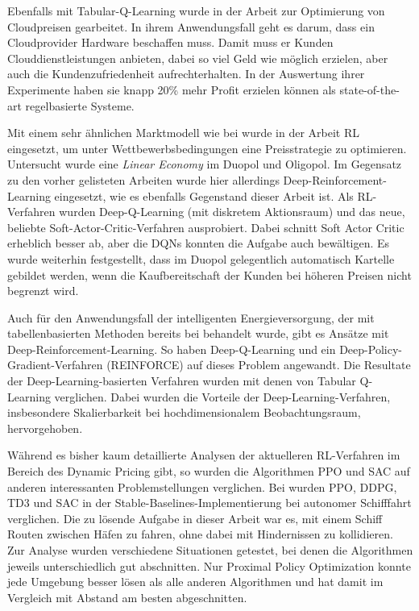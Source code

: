 Ebenfalls mit Tabular-Q-Learning wurde in der Arbeit \cite{9086147} zur Optimierung von Cloudpreisen gearbeitet.
In ihrem Anwendungsfall geht es darum, dass ein Cloudprovider Hardware beschaffen muss.
Damit muss er Kunden Clouddienstleistungen anbieten, dabei so viel Geld wie möglich erzielen, aber auch die Kundenzufriedenheit aufrechterhalten.
In der Auswertung ihrer Experimente haben sie knapp 20\% mehr Profit erzielen können als state-of-the-art regelbasierte Systeme.

Mit einem sehr ähnlichen Marktmodell wie bei \cite{10.1145/3219819.3219833} wurde in der Arbeit \cite{Kastius2022} RL eingesetzt, um unter Wettbewerbsbedingungen eine Preisstrategie zu optimieren.
Untersucht wurde eine \textit{Linear Economy} im Duopol und Oligopol.
Im Gegensatz zu den vorher gelisteten Arbeiten wurde hier allerdings Deep-Reinforcement-Learning eingesetzt, wie es ebenfalls Gegenstand dieser Arbeit ist.
Als RL-Verfahren wurden Deep-Q-Learning (mit diskretem Aktionsraum) und das neue, beliebte Soft-Actor-Critic-Verfahren ausprobiert.
Dabei schnitt Soft Actor Critic erheblich besser ab, aber die DQNs konnten die Aufgabe auch bewältigen.
Es wurde weiterhin festgestellt, dass im Duopol gelegentlich automatisch Kartelle gebildet werden, wenn die Kaufbereitschaft der Kunden bei höheren Preisen nicht begrenzt wird.

Auch für den Anwendungsfall der intelligenten Energieversorgung, der mit tabellenbasierten Methoden bereits bei \cite{Kim2016DynamicPA} behandelt wurde, gibt es Ansätze mit Deep-Reinforcement-Learning.
So haben \cite{8356086} Deep-Q-Learning und ein Deep-Policy-Gradient-Verfahren (REINFORCE) auf dieses Problem angewandt.
Die Resultate der Deep-Learning-basierten Verfahren wurden mit denen von Tabular Q-Learning verglichen.
Dabei wurden die Vorteile der Deep-Learning-Verfahren, insbesondere Skalierbarkeit bei hochdimensionalem Beobachtungsraum, hervorgehoben.

Während es bisher kaum detaillierte Analysen der aktuelleren RL-Verfahren im Bereich des Dynamic Pricing gibt, so wurden die Algorithmen PPO und SAC auf anderen interessanten Problemstellungen verglichen.
Bei \cite{LarsenVessel} wurden PPO, DDPG, TD3 und SAC in der Stable-Baselines-Implementierung bei autonomer Schifffahrt verglichen.
Die zu lösende Aufgabe in dieser Arbeit war es, mit einem Schiff Routen zwischen Häfen zu fahren, ohne dabei mit Hindernissen zu kollidieren.
Zur Analyse wurden verschiedene Situationen getestet, bei denen die Algorithmen jeweils unterschiedlich gut abschnitten.
Nur Proximal Policy Optimization konnte jede Umgebung besser lösen als alle anderen Algorithmen und hat damit im Vergleich mit Abstand am besten abgeschnitten.

